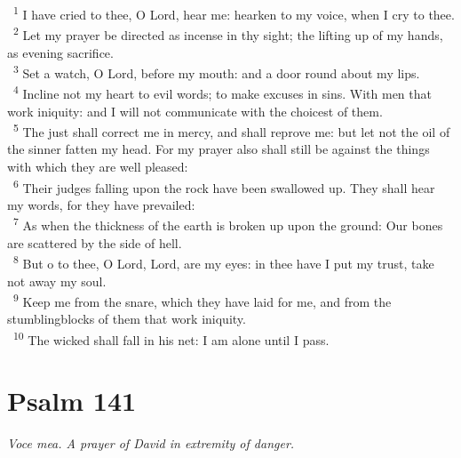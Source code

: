 \documentclass[a5paper,12pt]{article}
\begin{document}
\begin{multicols*}{2}
~\textsuperscript{1} I have cried to thee, O Lord, hear me: hearken to my voice, when I cry to thee.\\
~\textsuperscript{2} Let my prayer be directed as incense in thy sight; the lifting up of my hands, as evening sacrifice.\\
~\textsuperscript{3} Set a watch, O Lord, before my mouth: and a door round about my lips.\\
~\textsuperscript{4} Incline not my heart to evil words; to make excuses in sins. With men that work iniquity: and I will not communicate with the choicest of them.\\
~\textsuperscript{5} The just shall correct me in mercy, and shall reprove me: but let not the oil of the sinner fatten my head. For my prayer also shall still be against the things with which they are well pleased:\\
~\textsuperscript{6} Their judges falling upon the rock have been swallowed up. They shall hear my words, for they have prevailed:\\
~\textsuperscript{7} As when the thickness of the earth is broken up upon the ground: Our bones are scattered by the side of hell.\\
~\textsuperscript{8} But o to thee, O Lord, Lord, are my eyes: in thee have I put my trust, take not away my soul.\\
~\textsuperscript{9} Keep me from the snare, which they have laid for me, and from the stumblingblocks of them that work iniquity.\\
~\textsuperscript{10} The wicked shall fall in his net: I am alone until I pass.\\

\section{Psalm 141}
\label{sec:org9e414ec}
\emph{Voce mea. A prayer of David in extremity of danger.}\\


\end{multicols*}
\end{document}
